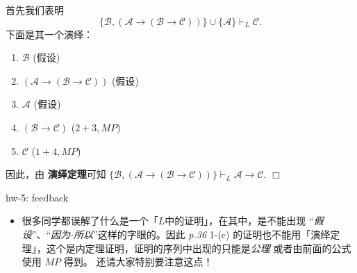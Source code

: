 \documentclass[UTF8,12pt,a4paper]{ctexart}
\begin{document}
首先我们表明
\[
\{\mathscr{B}, (\mathscr{A} \to (\mathscr{B} \to \mathscr{C}))\} \cup \{ \mathscr{A}\} \vdash_L \mathscr{C}.
\]
下面是其一个演绎：
\begin{enumerate}
	\item $\mathscr{B}$  
	\hfill (假设)
	
	\item $(\mathscr{A} \to (\mathscr{B} \to \mathscr{C}))$
	\hfill (假设)
	
	\item $\mathscr{A}$
	\hfill (假设)
	
	\item $(\mathscr{B} \to \mathscr{C})$
	\hfill ($2+3,MP$)
	
	\item $\mathscr{C}$
	\hfill ($1+4, MP$)
\end{enumerate} 

因此，由 \textbf{演绎定理}可知
$
\{\mathscr{B}, (\mathscr{A} \to (\mathscr{B} \to \mathscr{C}))\} \vdash_L \mathscr{A} \to \mathscr{C}.
$
\hfill $\Box$

\vspace{1em}

\dotfill hw-5: feedback
\dotfill

\begin{itemize}
	\item  很多同学都误解了什么是一个「$L$中的证明」，在其中，是不能出现 “\textit{假设}”、“\textit{因为-所以}”这样的字眼的。因此
	\textit{p.36} 1-(c) 的证明也不能用「演绎定理」，这个是内定理证明，证明的序列中出现的只能是\textit{公理} 或者由前面的公式使用 $MP$ 得到。  还请大家特别要注意这点！
\end{itemize}
\end{document}
